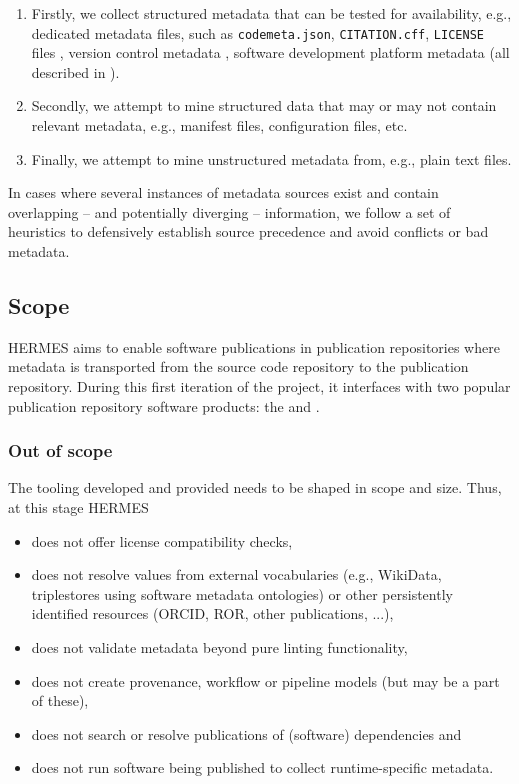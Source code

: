 \documentclass[11pt,a4paper]{scrartcl}
\newcommand{\fn}[1]{\texttt{#1}}
\begin{document}
\begin{enumerate}  
    \item Firstly, we collect structured metadata that can be tested for availability, e.g., dedicated metadata files, such as
          \fn{codemeta.json}, \fn{CITATION.cff}, \fn{LICENSE} files , version control metadata ,
          software development platform metadata (all described in ).
    \item Secondly, we attempt to mine structured data that may or may not contain relevant metadata, e.g., manifest files, configuration files, etc.
    \item Finally, we attempt to mine unstructured metadata from, e.g., plain text files.
\end{enumerate}

In cases where several instances of metadata sources exist and contain overlapping -- and potentially diverging --
information, we follow a set of heuristics to defensively establish source precedence and avoid conflicts or bad metadata.



\subsection{Scope}\label{subsec:concept-scope}
HERMES aims to enable software publications in publication repositories where metadata is transported from the source code repository
to the publication repository. During this first iteration of the project, it interfaces with two popular publication repository 
software products: the  and .

\subsubsection{Out of scope}\label{subsubsec:concept-scope-out}
The tooling developed and provided needs to be shaped in scope and size. Thus, at this stage HERMES

\begin{itemize}  
    \item does not offer license compatibility checks,
    \item does not resolve values from external vocabularies (e.g., WikiData, triplestores using software metadata ontologies) or
          other persistently identified resources (ORCID, ROR, other publications, ...),
    \item does not validate metadata beyond pure linting functionality,
    \item does not create provenance, workflow or pipeline models (but may be a part of these),
    \item does not search or resolve publications of (software) dependencies and
    \item does not run software being published to collect runtime-specific metadata.
\end{itemize}
\end{document}
